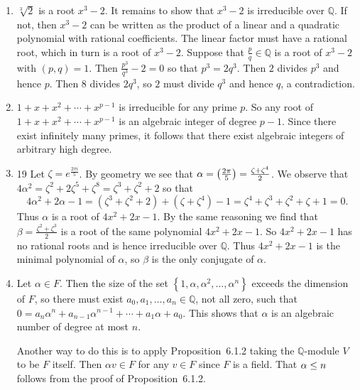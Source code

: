 \documentclass[12pt]{article}
\let\deg\relax\DeclareMathOperator{\deg}{\mathsf{deg}}
\let\cos\relax\DeclareMathOperator{\cos}{\mathsf{cos}}
\begin{document}
\begin{enumerate}
\item %
$\sqrt[3]{2}$ is a root $x^3-2$. It remains to
show that $x^3-2$ is irreducible over $\mathbb{Q}$.
If not, then $x^3-2$ can be written as the product
of a linear and a quadratic polynomial with rational coefficients.
The linear factor must have a rational root, which in turn
is a root of $x^3-2$.
Suppose that $\frac{p}{q}\in\mathbb{Q}$
is a root of $x^3-2$ with $\left(p,q\right)=1$.
Then $\frac{p^3}{q^3}-2=0$ so that $p^3=2q^3$. Then $2$
divides $p^3$ and hence $p$. Then $8$ divides $2q^3$,
so $2$ must divide $q^3$ and hence $q$, a contradiction.

\item %
$1+x+x^2+\cdots+x^{p-1}$ is irreducible for any prime $p$.
So any root of $1+x+x^2+\cdots+x^{p-1}$ is an algebraic
integer of degree $p-1$.
Since there exist infinitely many primes,
it follows that there exist algebraic integers of arbitrary
high degree.

\item 19
Let $\zeta=e^{\frac{2\pi i}{5}}$.
By geometry we see that $\alpha=\cos\left(\frac{2\pi}{5}\right)
=\frac{\zeta+\zeta^4}{2}$.
We observe that $4\alpha^2=\zeta^2+2\zeta^5+\zeta^8
=\zeta^3+\zeta^2+2$ so that
\[4\alpha^2+2\alpha-1=\left(\zeta^3+\zeta^2+2\right)+
\left(\zeta+\zeta^4\right)-1
=\zeta^4+\zeta^3+\zeta^2+\zeta+1=0.\]
Thus $\alpha$ is a root of $4x^2+2x-1$.
By the same reasoning we find that $\beta=\frac{\zeta^2+\zeta^3}{2}$
is a root of the same polynomial
$4x^2+2x-1$.
So $4x^2+2x-1$ has no rational roots and
is hence irreducible over $\mathbb{Q}$. Thus $4x^2+2x-1$
is the minimal polynomial of $\alpha$, so $\beta$ is the
only conjugate of $\alpha$.

\item %
Let $\alpha\in F$. Then the size of the set
$\left\{1,\alpha,\alpha^2,\ldots,\alpha^n\right\}$
exceeds the dimension of $F$, so there must exist
$a_0,a_1,\ldots,a_n\in\mathbb{Q}$, not all zero,
such that $0=a_n\alpha^n+a_{n-1}\alpha^{n-1}+\cdots+a_1\alpha+a_0$.
This shows that $\alpha$ is an algebraic number of degree
at most $n$.

Another way to do this is to apply Proposition~6.1.2
taking the $\mathbb{Q}$-module $V$ to be $F$ itself.
Then $\alpha v\in F$ for any $v\in F$ since $F$ is a field.
That $\deg\alpha\le n$ follows from the proof of Proposition~6.1.2.


\end{enumerate}
\end{document}
